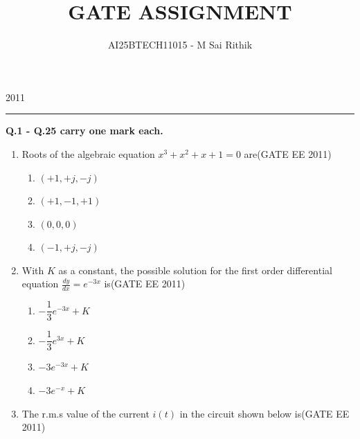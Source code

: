 \documentclass[a4paper,10pt]{exam}
\theoremstyle{remark}
\begin{document}
\title{
GATE ASSIGNMENT}
\author{AI25BTECH11015 - M Sai Rithik}

\raggedright{2011}
\hfill
{}\\

\noindent\rule{\textwidth}{0.4pt}
\raggedright{\textbf{Q.1 - Q.25 carry one mark each.}}

\vspace{0.4cm}

\begin{enumerate}
    

\item \quad Roots of the algebraic equation $
x^3 + x^2 + x + 1 = 0
$ are\hfill{(GATE EE 2011)}

\begin{multicols}{4}
\begin{enumerate}
    \item $(+1, +j, -j)$
\item $(+1, -1, +1)$
\item $(0, 0, 0)$
\item $(-1, +j, -j)$
\end{enumerate}
\end{multicols}

\item \quad With $K$ as a constant, the possible solution for the first order differential equation
$
\frac{dy}{dx} = e^{-3x}
$
is\hfill{(GATE EE 2011)}

\begin{multicols}{4}
\begin{enumerate}
   \item $-\dfrac{1}{3}e^{-3x} + K$
\item $-\dfrac{1}{3}e^{3x} + K$
\item $-3e^{-3x} + K$
\item $-3e^{-x} + K$
\end{enumerate}
\end{multicols}

\item \quad The r.m.s value of the current $i(t)$ in the circuit shown below is\hfill{(GATE EE 2011)}


\end{enumerate}
\end{document}
